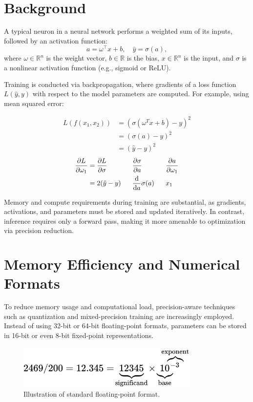 \documentclass[11pt]{article}
\begin{document}
	\section{Background}

	A typical neuron in a neural network performs a weighted sum of its inputs, followed by an activation function:
	\[
	a = \omega^\top x + b,\quad \hat{y} = \sigma(a),
	\]
	where \( \omega \in \mathbb{R}^n \) is the weight vector, \( b \in \mathbb{R} \) is the bias, \( x \in \mathbb{R}^n \) is the input, and \( \sigma \) is a nonlinear activation function (e.g., sigmoid or ReLU).

	Training is conducted via backpropagation, where gradients of a loss function \( L(\hat{y}, y) \) with respect to the model parameters are computed. For example, using mean squared error:

  	\begin{align*}
    	L(f(x_1, x_2)) &= (\sigma(\omega^T x + b) - y) ^2\\
                   	&= (\sigma(a) - y) ^ 2\\
                   	&= (\hat y - y) ^ 2
  	\end{align*}
  	\begin{alignat*}{3}
    	\pdv{L}{\omega_1} &= \pdv{L}{\sigma} &&\pdv{\sigma}{a}      &&\pdv{a}{\omega_1}\\
                      	&= 2(\hat y - y)~~ &&\odv{}{a}\sigma(a)~~ &&x_1
  	\end{alignat*}

	Memory and compute requirements during training are substantial, as gradients, activations, and parameters must be stored and updated iteratively. In contrast, inference requires only a forward pass, making it more amenable to optimization via precision reduction.

	\section{Memory Efficiency and Numerical Formats}

	To reduce memory usage and computational load, precision-aware techniques such as quantization and mixed-precision training are increasingly employed. Instead of using 32-bit or 64-bit floating-point formats, parameters can be stored in 16-bit or even 8-bit fixed-point representations.

	\begin{figure}[H]
    	\centering
    	\includegraphics[width=0.8\textwidth]{figures/float.png}
    	\caption{Illustration of standard floating-point format.}
	\end{figure}
\end{document}
